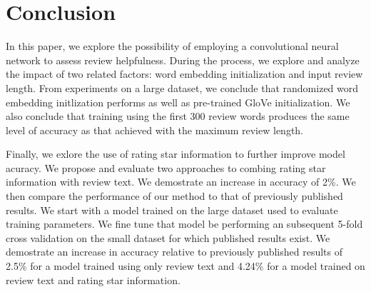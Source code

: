 \documentclass[conference,compsoc]{IEEEtran}
\begin{document}
\section{Conclusion}\label{sec:conclusion}
In this paper, we explore the possibility of employing a convolutional neural network to assess review helpfulness. During the process, we explore and analyze the impact of two related factors: word embedding initialization and input review length. From experiments on a large dataset, we conclude that randomized word embedding initlization performs as well as pre-trained GloVe initialization. We also conclude that training using the first 300 review words produces the same level of accuracy as that achieved with the maximum review length. 

Finally, we exlore the use of rating star information to further improve model acuracy. We propose and evaluate two approaches to combing rating star information with review text. We demostrate an increase in accuracy of 2\%. We then compare the performance of our method to that of previously published results. We start with a model trained on the large dataset used to evaluate training parameters. We fine tune that model be performing an subsequent 5-fold cross validation on the small dataset for which published results exist. We demostrate an increase in accuracy relative to previously published results of 2.5\% for a model trained using only review text and 4.24\% for a model trained on review text and rating star information.




%
%



\end{document}

